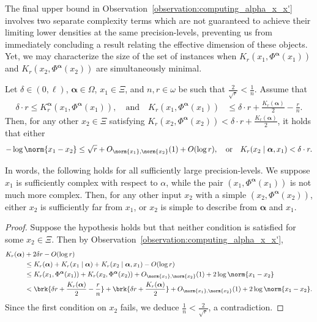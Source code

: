 The final upper bound in Observation~\ref{observation:computing_alpha_x_x'} involves two separate complexity terms which are not guaranteed to achieve their limiting lower densities at the same precision-levels, preventing us from immediately concluding a result relating the effective dimension of these objects. Yet, we may characterize the size of the set of instances when $K_r(x_1, \Phi^{\boldsymbol{\alpha}}(x_1))$ and $K_r(x_2, \Phi^{\boldsymbol{\alpha}}(x_2))$ are simultaneously minimal. 

\begin{lemma}
    \label{lemma:simultaneously_minimal_complexities}
    Let $\delta \in (0, \ell)$, $\boldsymbol{\alpha} \in \Omega$, $x_1 \in \Xi$, and $n, r \in \omega$ be such that $\frac{2}{\sqrt{r}} < \frac{1}{n}$. Assume that 
    \begin{align*}
        \delta \cdot r \leq K_r^{\boldsymbol{\alpha}}(x_1, \Phi^{\boldsymbol{\alpha}}(x_1)), \quad \text{and} \quad K_r(x_1, \Phi^{\boldsymbol{\alpha}}(x_1)) &\leq \delta \cdot r + \frac{K_r(\boldsymbol{\alpha})}{2} - \frac{r}{n}.
    \end{align*}
    Then, for any other $x_2 \in \Xi$ satisfying $K_r(x_2, \Phi^{\boldsymbol{\alpha}}(x_2)) < \delta \cdot r + \frac{K_r(\boldsymbol{\alpha})}{2}$, it holds that either
    \begin{align*}
        - \log \norm{x_1 - x_2} \leq \sqrt{r} + O_{\norm{x_1}, \norm{x_2}}(1) + O(\log r), \quad \text{or} \quad K_r(x_2 \mid \boldsymbol{\alpha}, x_1) < \delta \cdot r.
    \end{align*}
\end{lemma}

In words, the following holds for all sufficiently large precision-levels. We suppose $x_1$ is sufficiently complex with respect to $\alpha$, while the pair $(x_1, \Phi^{\boldsymbol{\alpha}}(x_1))$ is not much more complex. Then, for any other input $x_2$ with a simple $(x_2, \Phi^{\boldsymbol{\alpha}}(x_2))$, either $x_2$ is sufficiently far from $x_1$, or $x_2$ is simple to describe from $\boldsymbol{\alpha}$ and $x_1$. 

\begin{proof}
    Suppose the hypothesis holds but that neither condition is satisfied for some $x_2 \in \Xi$. Then by Observation~\ref{observation:computing_alpha_x_x'},
    \begin{align*}
        K_r(\boldsymbol{\alpha}) &+ 2 \delta r - O(\log r)
        \\&\leq
        K_r(\boldsymbol{\alpha}) + K_r(x_1 \mid \boldsymbol{\alpha}) + K_r(x_2 \mid \boldsymbol{\alpha}, x_1) - O(\log r)\\
        &\leq K_r(x_1, \Phi^{\boldsymbol{\alpha}}(x_1)) + K_r(x_2, \Phi^{\boldsymbol{\alpha}}(x_2)) + O_{\norm{x_1}, \norm{x_2}}(1) + 2 \log \norm{x_1 - x_2}\\
        &< \brk{\delta r + \frac{K_r(\boldsymbol{\alpha})}{2} - \frac{r}{n}} + \brk{\delta r + \frac{K_r(\boldsymbol{\alpha})}{2}} + O_{\norm{x_1}, \norm{x_2}}(1) + 2 \log \norm{x_1 - x_2}.
    \end{align*}
    Since the first condition on $x_2$ fails, we deduce $\frac{1}{n} < \frac{2}{\sqrt{r}}$, a contradiction. 
\end{proof}

